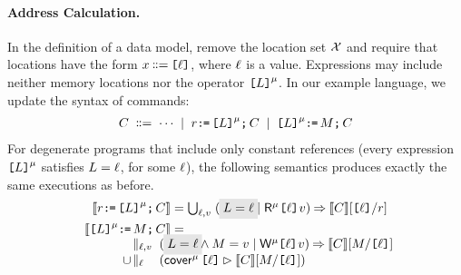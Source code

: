 \paragraph{Address Calculation.}
In the definition of a data model, remove the location set $\mathcal{X}$ and require
that locations have the form $x\!\!\;\mathrel{\mathord{\vcentcolon}\mkern-1mu\mathord{\vcentcolon}\mathord{{=}}}\;\!\!\texttt{[}\ell\texttt{]}$, where $\ell$
is a value.  Expressions may include neither memory locations nor the
operator $\texttt{[}L\texttt{]}^{\mu}$.
In our example language, we update the syntax of commands:
\begin{gather*}
  C
  \;\mathrel{\mathord{\vcentcolon}\mkern-1mu\mathord{\vcentcolon}\mathord{{=}}}\; \cdots
  \;\mathrel{|}\; r\texttt{:}\mkern-1mu\texttt{=}\,\texttt{[}L\texttt{]}^{\mu}\texttt{;}\,\allowbreak C 
  \;\mathrel{|}\; \texttt{[}L\texttt{]}^{\mu}\texttt{:}\mkern-1mu\texttt{=}\,M\texttt{;}\,\allowbreak C
\end{gather*}
For degenerate programs that include only constant references (every
expression $\texttt{[}L\texttt{]}^\mu$ satisfies $L=\ell$, for some $\ell$), the
following semantics produces exactly the same executions as before.
\begin{align*}
  \sem{\aReg\GETS\REF{\cExp}^\amode\SEMI \aCmd} & =
  \textstyle\bigcup_{\cVal,\aVal}\; (\;\mathhl{\cExp=\cVal} \mid \DRmode{\REF{\cVal}}\aVal) \prefix \sem{\aCmd}[\REF{\cVal}/\aReg]  
  \\
  \sem{\REF{\cExp}^\amode\GETS\aExp\SEMI \aCmd} & =
  \\[-1ex]
  &\mkern-68mu\hbox to 0pt{$\begin{aligned}
    &\textstyle\parallel_{\cVal,\aVal}\;(\;\mathhl{\cExp=\cVal} \land \aExp=\aVal \mid \DWmode{\REF{\cVal}}\aVal) \prefix \sem{\aCmd}[\aExp/\REF{\cVal}]
    \\[-.5ex]  \cup\!&
    \textstyle\parallel_{\cVal\phantom{,\aVal}}\; %
    (\relfilt{\REF{\cVal}} \sem{\aCmd}[\aExp/\REF{\cVal}])    
  \end{aligned}$}
\end{align*}
